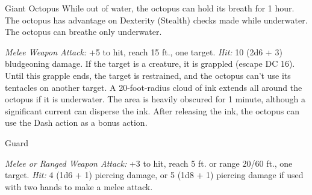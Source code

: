 \documentclass[10pt,a4paper,twoside,twocolumn,openany,bg=none,nodeprecatedcode]{dndbook}
\begin{document}
\begin{DndMonster}[float*=t]{Giant Octopus}
\DndMonsterBasics[
armor-class = {11},
hit-points = {\DndDice{8d10 + 8}},
speed = {10 ft., 60 ft. (key)}
]
\DndMonsterAbilityScores[
 str = 17,
 dex = 13,
 con = 13,
 int = 4,
 wis = 10,
 cha = 4
]
\DndMonsterDetails[
skills = {Perception +4, Stealth +5},
senses = {darkvision 60 ft., passive perception 14},
challenge = 1,
]
While out of water, the octopus can hold its breath for 1 hour.
The octopus has advantage on Dexterity (Stealth) checks made while underwater.
The octopus can breathe only underwater.
\par
{}
\textsl{Melee Weapon Attack:} +5 to hit, reach 15 ft., one target. \textsl{Hit:} 10 (2d6 + 3) bludgeoning damage. If the target is a creature, it is grappled (escape DC 16). Until this grapple ends, the target is restrained, and the octopus can't use its tentacles on another target.
A 20-foot-radius cloud of ink extends all around the octopus if it is underwater. The area is heavily obscured for 1 minute, although a significant current can disperse the ink. After releasing the ink, the octopus can use the Dash action as a bonus action.
\end{DndMonster}


\begin{DndMonster}[float*=t]{Guard}
\DndMonsterBasics[
armor-class = {16 (chain shirt)},
hit-points = {\DndDice{2d8 + 2}},
speed = {30 ft.}
]
\DndMonsterAbilityScores[
 str = 13,
 dex = 12,
 con = 12,
 int = 10,
 wis = 11,
 cha = 10
]
\DndMonsterDetails[
skills = {Perception +2},
languages = {any one language (usually Common)},
challenge = 1/8,
]
\par
{}
\textsl{Melee or Ranged Weapon Attack:} +3 to hit, reach 5 ft. or range 20/60 ft., one target. \textsl{Hit:} 4 (1d6 + 1) piercing damage, or 5 (1d8 + 1) piercing damage if used with two hands to make a melee attack.
\end{DndMonster}
\end{document}
